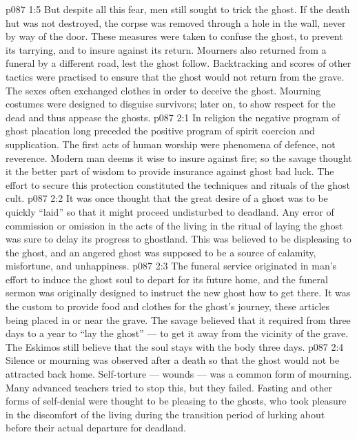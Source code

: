 \vs p087 1:5 But despite all this fear, men still sought to trick the ghost. If the death hut was not destroyed, the corpse was removed through a hole in the wall, never by way of the door. These measures were taken to confuse the ghost, to prevent its tarrying, and to insure against its return. Mourners also returned from a funeral by a different road, lest the ghost follow. Backtracking and scores of other tactics were practised to ensure that the ghost would not return from the grave. The sexes often exchanged clothes in order to deceive the ghost. Mourning costumes were designed to disguise survivors; later on, to show respect for the dead and thus appease the ghosts.
\vs p087 2:1 In religion the negative program of ghost placation long preceded the positive program of spirit coercion and supplication. The first acts of human worship were phenomena of defence, not reverence. Modern man deems it wise to insure against fire; so the savage thought it the better part of wisdom to provide insurance against ghost bad luck. The effort to secure this protection constituted the techniques and rituals of the ghost cult.
\vs p087 2:2 \pc It was once thought that the great desire of a ghost was to be quickly “laid” so that it might proceed undisturbed to deadland. Any error of commission or omission in the acts of the living in the ritual of laying the ghost was sure to delay its progress to ghostland. This was believed to be displeasing to the ghost, and an angered ghost was supposed to be a source of calamity, misfortune, and unhappiness.
\vs p087 2:3 The funeral service originated in man’s effort to induce the ghost soul to depart for its future home, and the funeral sermon was originally designed to instruct the new ghost how to get there. It was the custom to provide food and clothes for the ghost’s journey, these articles being placed in or near the grave. The savage believed that it required from three days to a year to “lay the ghost” --- to get it away from the vicinity of the grave. The Eskimos still believe that the soul stays with the body three days.
\vs p087 2:4 Silence or mourning was observed after a death so that the ghost would not be attracted back home. Self\hyp{}torture --- wounds --- was a common form of mourning. Many advanced teachers tried to stop this, but they failed. Fasting and other forms of self\hyp{}denial were thought to be pleasing to the ghosts, who took pleasure in the discomfort of the living during the transition period of lurking about before their actual departure for deadland.
